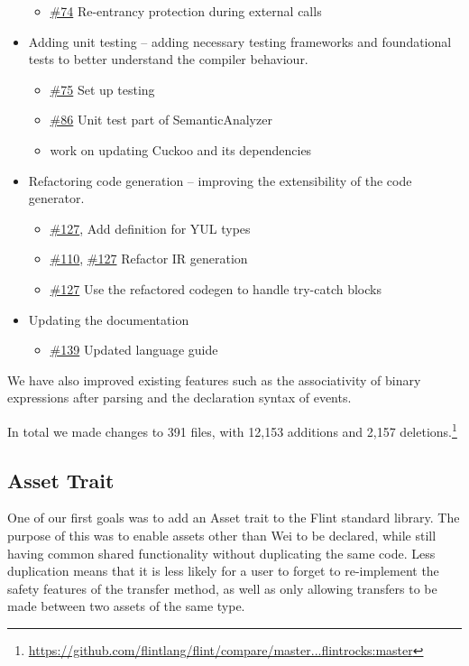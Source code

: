 \begin{itemize}
\begin{itemize}
		\item \href{https://github.com/flintrocks/flint/pull/74}{\#74} Re-entrancy protection during external calls
	\end{itemize}
	\item Adding unit testing – adding necessary testing frameworks and foundational tests to better understand the compiler behaviour.
	\begin{itemize}
		\item \href{https://github.com/flintrocks/flint/pull/75}{\#75} Set up testing
		\item \href{https://github.com/flintrocks/flint/pull/86}{\#86} Unit test part of SemanticAnalyzer
		\item work on updating Cuckoo and its dependencies
	\end{itemize}
	\item Refactoring code generation – improving the extensibility of the code generator.
	\begin{itemize}
		\item \href{https://github.com/flintrocks/flint/pull/127}{\#127}, Add definition for YUL types
		\item \href{https://github.com/flintrocks/flint/pull/110}{\#110}, \href{https://github.com/flintrocks/flint/pull/127}{\#127} Refactor IR generation
		\item \href{https://github.com/flintrocks/flint/pull/127}{\#127} Use the refactored codegen to handle try-catch blocks
	\end{itemize}
	\item Updating the documentation
	\begin{itemize}
		\item \href{https://github.com/flintrocks/flint/pull/139}{\#139} Updated language guide
	\end{itemize}
\end{itemize}

We have also improved existing features such as the associativity of binary expressions after parsing and the declaration syntax of events.

In total we made changes to 391 files, with 12,153 additions and 2,157 deletions.\footnote{\url{https://github.com/flintlang/flint/compare/master...flintrocks:master}}

\subsection{Asset Trait}

One of our first goals was to add an Asset trait to the Flint standard library. The purpose of this was to enable assets other than Wei to be declared, while still having common shared functionality without duplicating the same code. Less duplication means that it is less likely for a user to forget to re-implement the safety features of the transfer method, as well as only allowing transfers to be made between two assets of the same type.


